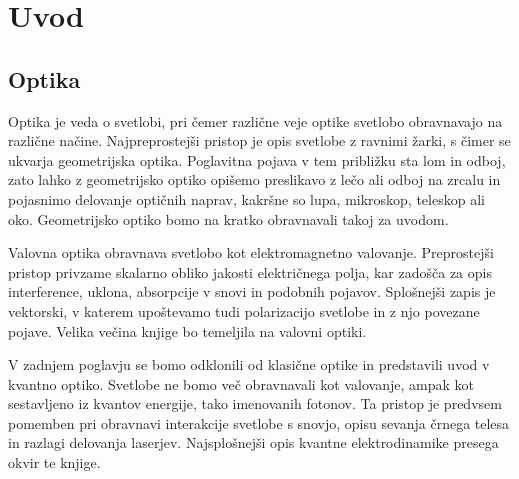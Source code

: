 
\chapter{Uvod}

\section{Optika}
Optika je veda o svetlobi, pri čemer različne veje optike svetlobo
obravnavajo na različne načine. Najpreprostejši pristop je 
opis svetlobe z ravnimi žarki, s čimer se ukvarja geometrijska optika. 
Poglavitna pojava v tem približku sta lom in odboj, 
zato lahko z geometrijsko optiko opišemo preslikavo z lečo ali 
odboj na zrcalu in pojasnimo delovanje optičnih naprav, kakršne so 
lupa, mikroskop, teleskop ali oko. Geometrijsko optiko bomo na kratko
obravnavali takoj za uvodom.

Valovna optika obravnava svetlobo kot elektromagnetno valovanje. Preprostejši
pristop privzame skalarno obliko jakosti električnega polja, kar zadošča
za opis interference, uklona, absorpcije v snovi in podobnih pojavov. Splošnejši
zapis je vektorski, v katerem upoštevamo tudi polarizacijo svetlobe in 
z njo povezane pojave. Velika večina knjige bo temeljila na valovni optiki.  

V zadnjem poglavju se bomo odklonili od klasične optike in
predstavili uvod v kvantno optiko. Svetlobe ne bomo več obravnavali  
kot valovanje, ampak kot sestavljeno iz kvantov energije, tako 
imenovanih fotonov. Ta pristop je predvsem pomemben 
pri obravnavi interakcije svetlobe s snovjo, opisu sevanja 
črnega telesa in razlagi delovanja laserjev. Najsplošnejši opis 
kvantne elektrodinamike presega okvir te knjige. 

